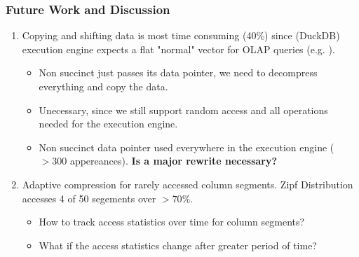 \documentclass{beamer}
\begin{document}
\begin{frame}
    \frametitle{Future Work and Discussion}

    \begin{enumerate}

    \item Copying and shifting data is most time consuming (40\%) since (DuckDB) execution engine expects a 
    flat "normal" vector for OLAP queries (e.g. {}).
    \begin{itemize}
        \item Non succinct just passes its data pointer, we need to decompress everything and copy the data.
        \item Unecessary, since we still support random access and all operations needed for the execution engine.
        \item Non succinct data pointer used everywhere in the execution engine ($>300$ appereances). \textbf{Is a major rewrite necessary?}
    \end{itemize}

    \vspace{0.3cm} 

    \item Adaptive compression for rarely accessed column segments. Zipf Distribution accesses 4 of 50 segements 
    over $>70\%$.
    \begin{itemize}
        \item How to track access statistics over time for column segments?
        \item What if the access statistics change after greater period of time?
    \end{itemize}
\end{enumerate}

\end{frame}
\end{document}
